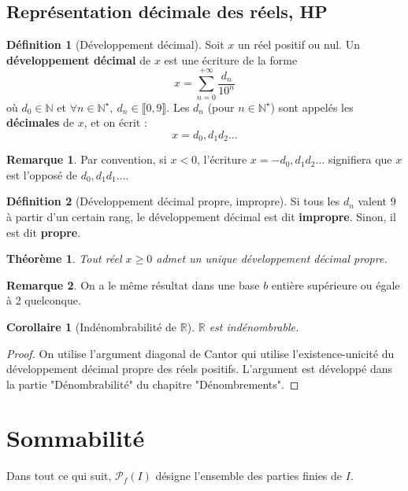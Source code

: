 \documentclass[french]{book}
\newcommand{\N}{\mathbb{N}}
\newcommand{\R}{\mathbb{R}}
\newcommand{\st}{^\star}
\theoremstyle{plain}
\newtheorem{thm}{Théorème}[chapter]
\newtheorem{cor}{Corollaire}[chapter]
\theoremstyle{definition}
\newtheorem{dfn}{Définition}[chapter]
\newtheorem{rmq}{Remarque}[chapter]
\theoremstyle{remark}
\begin{document}
\section{Représentation décimale des réels, HP}
\begin{dfn}[Développement décimal]
	Soit $x$ un réel positif ou nul. Un \textbf{développement décimal} de $x$ est une écriture de la forme $$x=\sum_{n=0}^{+\infty}\frac{d_n}{10^n}$$ où $d_0\in\N$ et $\forall n\in\N\st,\ d_n\in\llbracket0,9\rrbracket$. Les $d_n$ (pour $n\in\N\st$) sont appelés les \textbf{décimales} de $x$, et on écrit : $$x=d_0,d_1d_2\ldots$$
\end{dfn}
\begin{rmq} Par convention, si $x<0$, l'écriture $x=-d_0,d_1d_2\ldots$ signifiera que $x$ est l'opposé de $d_0,d_1d_1\ldots$. \end{rmq}
\begin{dfn}[Développement décimal propre, impropre]
	Si tous les $d_n$ valent $9$ à partir d'un certain rang, le développement décimal est dit \textbf{impropre}. Sinon, il est dit \textbf{propre}.
\end{dfn}
\begin{thm}
	Tout réel $x\geqslant 0$ admet un unique développement décimal propre.
\end{thm}
\begin{rmq} On a le même résultat dans une base $b$ entière supérieure ou égale à 2 quelconque. \end{rmq}
\begin{cor}[Indénombrabilité de $\R$]
	$\R$ est indénombrable.
\end{cor}
\begin{proof}
	On utilise l'argument diagonal de Cantor qui utilise l'existence-unicité du développement décimal propre des réels positifs. L'argument est développé dans la partie "Dénombrabilité" du chapitre "Dénombrements".
\end{proof}

\newpage
\chapter{Sommabilité}
Dans tout ce qui suit, $\mathcal{P}_f(I)$ désigne l'ensemble des parties finies de $I$.
\end{document}
